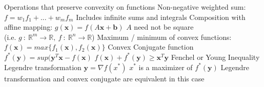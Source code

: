 \documentclass[14pt]{extarticle}
\begin{document}
\begin{outline}
			\2	Operations that preserve convexity on functions
				\3	Non-negative weighted sum: $f = w_1f_1 + ... + w_m f_m$
					\4	Includes infinite sums and integrals
				\3	Composition with affine mapping: $g(\bm{x}) = f(A\bm{x} + \bm{b})$
					\4	$A$ need not be square \\(i.e. $g~:~\mathbb{R}^m \rightarrow \mathbb{R},~f~:~\mathbb{R}^n \rightarrow \mathbb{R}$)
				\3	Maximum / minimum of convex functions: $f(\bm{x}) = max\{f_1(\bm{x}),f_2(\bm{x})\}$
				\3		
			\2	Convex Conjugate function
				\3	$f^*(\bm{y}) = sup (\bm{y}^T\bm{x} - f(\bm{x})$
				\3	$f(\bm{x}) + f^*(\bm{y}) \ge \bm{x}^T\bm{y}$
					\4	Fenchel or Young Inequality
				\3	Legendre transformation
					\4	$\bm{y} = \nabla f(x^*)$
					\4	$x^*$ is a maximizer of $f^*(\bm{y})$ 
					\4	Legendre transformation and convex conjugate are equivalent in this case
		

\end{outline}
\end{document}
